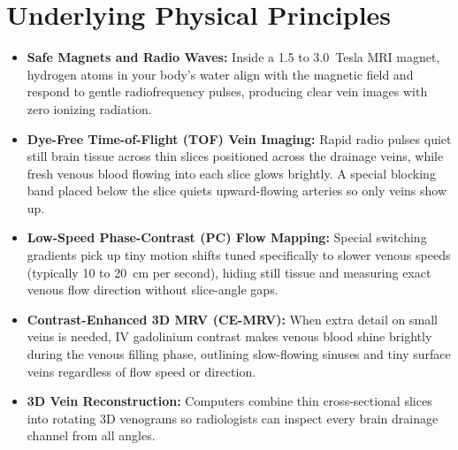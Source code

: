 \section{Underlying Physical Principles}
\begin{itemize}
\item \textbf{Safe Magnets and Radio Waves:} Inside a 1.5 to 3.0~Tesla MRI magnet, hydrogen atoms in your body's water align with the magnetic field and respond to gentle radiofrequency pulses, producing clear vein images with zero ionizing radiation.
\item \textbf{Dye-Free Time-of-Flight (TOF) Vein Imaging:} Rapid radio pulses quiet still brain tissue across thin slices positioned across the drainage veins, while fresh venous blood flowing into each slice glows brightly. A special blocking band placed below the slice quiets upward-flowing arteries so only veins show up.
\item \textbf{Low-Speed Phase-Contrast (PC) Flow Mapping:} Special switching gradients pick up tiny motion shifts tuned specifically to slower venous speeds (typically 10 to 20~cm per second), hiding still tissue and measuring exact venous flow direction without slice-angle gaps.
\item \textbf{Contrast-Enhanced 3D MRV (CE-MRV):} When extra detail on small veins is needed, IV gadolinium contrast makes venous blood shine brightly during the venous filling phase, outlining slow-flowing sinuses and tiny surface veins regardless of flow speed or direction.
\item \textbf{3D Vein Reconstruction:} Computers combine thin cross-sectional slices into rotating 3D venograms so radiologists can inspect every brain drainage channel from all angles.
\end{itemize}

